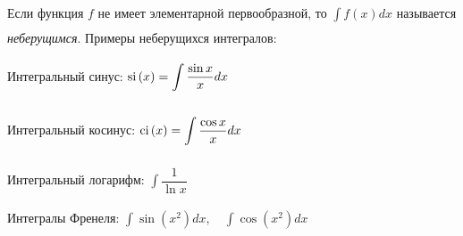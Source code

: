 \documentclass[../main.tex]{subfiles}
\begin{document}
Если функция \( f\) не имеет элементарной первообразной, то \( \displaystyle\int\limits_{ }^{ } f\left( x\right)dx\) называется \emph{неберущимся}. Примеры неберущихся интегралов: 

Интегральный синус: \( \operatorname{si}\left( x\right)=\displaystyle\int\limits_{ }^{ } \dfrac{ \sin x}{ x} dx\)

Интегральный косинус: \( \operatorname{ci}\left( x\right)=\displaystyle\int\limits_{ }^{ } \dfrac{ \cos x}{ x} dx\)

Интегральный логарифм: \( \displaystyle\int\limits_{ }^{ } \dfrac{ 1}{ \ln x} \)

Интегралы Френеля: \( \displaystyle\int\limits_{ }^{ } \sin\left( x^2\right)dx,\quad \displaystyle\int\limits_{ }^{ } \cos\left( x^2\right)dx\)
\end{document}
